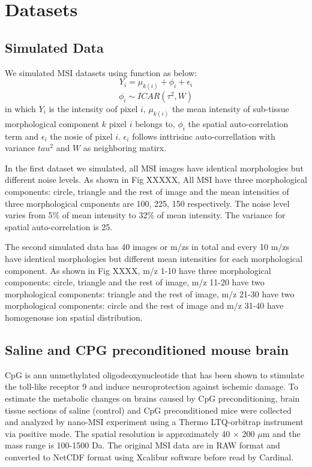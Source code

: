 \documentclass{bioinfo}
\begin{document}
\section{Datasets}

\subsection{Simulated Data}
We simulated MSI datasets using function as below:
$$Y_{i}=\mu_{k(i)}+ \phi_i + \epsilon_i $$
$$ \phi_i  \sim ICAR (\tau^2, W) $$
in which $Y_i$ is the intensity oof pixel $i$, $\mu_{k(i)}$ the mean intensity of sub-tissue morphological component $k$ pixel $i$ belongs to, $\phi_i$ the spatial auto-correlation term and $\epsilon_i$ the nosie of pixel $i$. $\epsilon_i$ follows inttrisinc auto-correllation with variance $tau^2$ and $W$ as neighboring matirx.




In the first dataset we simulated, all MSI images have identical morphologies but different noise levels. As shown in Fig XXXXX, All MSI have three morphological components: circle, triangle and the rest of image and the mean intensities of three morphological cmponents are 100, 225, 150 respectively. The noise level varies from 5\% of mean intensity to 32\% of mean intensity. The variance for spatial auto-correlation is 25.



The second simulated data has 40 images or m/zs in total and every 10 m/zs have identical morphologies but different mean intensities for each morphological component. As shown in Fig XXXX, m/z 1-10 have three morphological components: circle, triangle and the rest of image, m/z 11-20 have two morphological components: triangle and the rest of image, m/z 21-30 have two morphological components: circle and the rest of image and m/z 31-40  have homogenouse ion spatial distribution.

\subsection{Saline and CPG preconditioned mouse brain}
CpG is ann unmethylated oligodeoxynucleotide that has been shown to stimulate the toll-like receptor 9 and induce neuroprotection against ischemic damage. To estimate the metabolic changes on brains caused by CpG preconditioning, brain tissue sections of saline (control) and CpG preconditioned mice were collected and analyzed by nano-MSI experiment using a Thermo LTQ-orbitrap instrument via positive mode. The spatial resolution is approximately 40 $\times$ 200 $\mu$m and the mass range is 100-1500 Da. The original MSI data are in RAW format and converted to NetCDF format using Xcalibur software before read by Cardinal.
\end{document}
